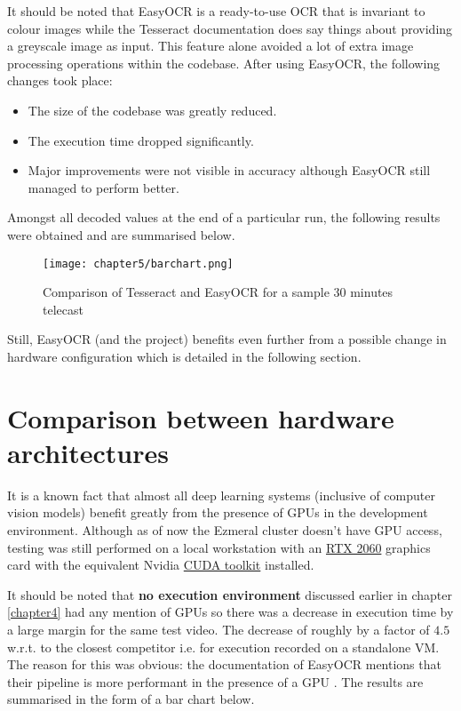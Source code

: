 It should be noted that EasyOCR is a ready-to-use OCR that is invariant to colour images while the Tesseract documentation does say things about providing a greyscale image as input. This feature alone avoided a lot of extra image processing operations within the codebase. After using EasyOCR, the following changes took place:

\begin{itemize}
 \item The size of the codebase was greatly reduced.
 \item The execution time dropped significantly.
 \item Major improvements were not visible in accuracy although EasyOCR still managed to perform better.
\end{itemize}

Amongst all decoded values at the end of a particular run, the following results were obtained and are summarised below.

\begin{figure}[h]
  \centering
  \texttt{[image: chapter5/barchart.png]}
  \caption{Comparison of Tesseract and EasyOCR for a sample $30$ minutes telecast}
  \label{fig:easy_vs_tess}
\end{figure}

Still, EasyOCR (and the project) benefits even further from a possible change in hardware configuration which is detailed in the following section.


\section{Comparison between hardware architectures}

It is a known fact that almost all deep learning systems (inclusive of computer vision models) benefit greatly from the presence of GPUs in the development environment. Although as of now the Ezmeral cluster doesn’t have GPU access, testing was still performed on a local workstation with an \href{ https://www.nvidia.com/en-in/geforce/20-series/}{RTX 2060} graphics card with the equivalent Nvidia \href{https://developer.nvidia.com/cuda-toolkit}{CUDA toolkit} installed. \par

It should be noted that \textbf{no execution environment} discussed earlier in chapter \ref{chapter4} had any mention of GPUs so there was a decrease in execution time by a large margin for the same test video. The decrease of roughly by a factor of $4.5$ w.r.t. to the closest competitor i.e. for execution recorded on a standalone VM. The reason for this was obvious: the documentation of EasyOCR mentions that their pipeline is more performant in the presence of a GPU \cite{Jaided}. The results are summarised in the form of a bar chart below.

